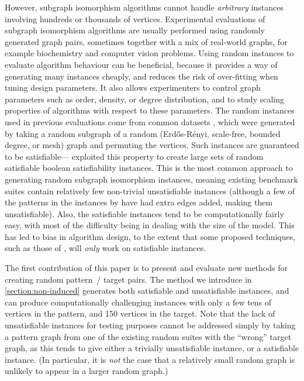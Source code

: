 \documentclass[twoside,11pt]{article}
\newcommand{\citet}[1]{\citeA{#1}}
\newcommand{\citep}[1]{\cite{#1}}
\begin{document}
However, subgraph isomorphism algorithms cannot handle \emph{arbitrary} instances involving hundreds
or thousands of vertices. Experimental evaluations of subgraph isomorphism algorithms are usually
performed using randomly generated graph pairs, sometimes together with a mix of real-world graphs,
for example biochemistry and computer vision problems. Using random instances to evaluate
algorithm behaviour can be beneficial, because it provides a way of generating many instances
cheaply, and reduces the risk of over-fitting when tuning design parameters. It also allows
experimenters to control graph parameters such as order, density, or degree distribution, and to
study scaling properties of algorithms with respect to these parameters.  The random instances used
in previous evaluations come from common datasets
\citep{DBLP:journals/prl/SantoFSV03,DBLP:journals/constraints/ZampelliDS10}, which were generated by
taking a random subgraph of a random (Erd\H{o}s-R\'enyi, scale-free, bounded degree, or mesh) graph
and permuting the vertices. Such instances are guaranteed to be satisfiable---\citet{o:AntonO09}
exploited this property to create large sets of random satisfiable boolean satisfiability instances.
This is the most common approach to generating random subgraph isomorphism instances, meaning
existing benchmark suites contain relatively few non-trivial unsatisfiable instances (although a few
of the patterns in the instances by \citeauthor{DBLP:journals/constraints/ZampelliDS10} have had
extra edges added, making them unsatisfiable). Also, the satisfiable instances tend to be
computationally fairly easy, with most of the difficulty being in dealing with the size of the
model. This has led to bias in algorithm design, to the extent that some proposed techniques, such
as those of \citet{DBLP:conf/sls/BattitiM07}, will \emph{only} work on satisfiable instances.

The first contribution of this paper is to present and evaluate new methods for creating random
pattern~/ target pairs.  The method we introduce in \cref{section:non-induced} generates both
satisfiable and unsatisfiable instances, and can produce computationally challenging instances with
only a few tens of vertices in the pattern, and 150 vertices in the target. Note that the lack of
unsatisfiable instances for testing purposes cannot be addressed simply by taking a pattern graph
from one of the existing random suites with the ``wrong'' target graph, as this tends to give either
a trivially unsatisfiable instance, or a satisfiable instance. (In particular, it is \emph{not} the
case that a relatively small random graph is unlikely to appear in a larger random graph.)
\end{document}
